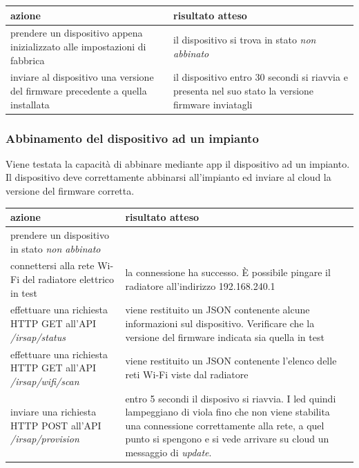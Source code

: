 \documentclass[a4paper,titlepage]{article}
\begin{document}
\begin{center}
\begin{tabular}{| p{5cm} | p{5cm} |}
    \hline \textbf{azione} & \textbf{risultato atteso} \\
    \hline prendere un dispositivo appena inizializzato alle impostazioni di fabbrica & il dispositivo si trova in stato \textit{non abbinato} \\
    \hline inviare al dispositivo una versione del firmware precedente a quella installata & il dispositivo entro 30 secondi si riavvia e presenta nel suo stato la versione firmware inviatagli \\
    \hline
\end{tabular}
\end{center}

\subsubsection{Abbinamento del dispositivo ad un impianto}

Viene testata la capacità di abbinare mediante app il dispositivo ad un impianto.
Il dispositivo deve correttamente abbinarsi all’impianto ed inviare al cloud la versione
del firmware corretta.

\begin{center}
\begin{tabular}{| p{5cm} | p{5cm} |}
    \hline \textbf{azione} & \textbf{risultato atteso} \\
    \hline prendere un dispositivo in stato \textit{non abbinato} & \\
    \hline connettersi alla rete Wi-Fi del radiatore elettrico in test & la connessione ha successo. È possibile pingare il radiatore all'indirizzo 192.168.240.1 \\
    \hline effettuare una richiesta HTTP GET all'API \textit{/irsap/status} & viene restituito un JSON contenente alcune informazioni sul dispositivo. Verificare che la versione del firmware indicata sia quella in test \\
    \hline effettuare una richiesta HTTP GET all'API \textit{/irsap/wifi/scan} & viene restituito un JSON contenente l'elenco delle reti Wi-Fi viste dal radiatore \\
    \hline inviare una richiesta HTTP POST all'API \textit{/irsap/provision} & entro 5 secondi il disposivo si riavvia. I led quindi lampeggiano di viola fino che non viene stabilita una connessione correttamente alla rete, a quel punto si spengono e si vede arrivare su cloud un messaggio di \textit{update}. \\
    \hline
\end{tabular}
\end{center}
\end{document}
